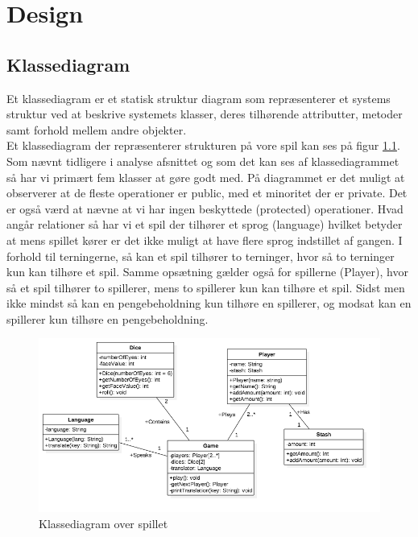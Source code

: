 \chapter{Design}



\section{Klassediagram}

\noindent Et klassediagram er et statisk struktur diagram som repræsenterer et systems struktur ved at beskrive systemets klasser, deres tilhørende attributter, metoder samt forhold mellem andre objekter.\\

\noindent Et klassediagram der repræsenterer strukturen på vore spil kan ses på figur \ref{fig:class_diagram}.
Som nævnt tidligere i analyse afsnittet og som det kan ses af klassediagrammet så har vi primært fem klasser at gøre godt med.
På diagrammet er det muligt at observerer at de fleste operationer er public, med et minoritet der er private.
Det er også værd at nævne at vi har ingen beskyttede (protected) operationer.
Hvad angår relationer så har vi et spil der tilhører et sprog (language) hvilket betyder at mens spillet kører er det ikke muligt at have flere sprog indstillet af gangen.
I forhold til terningerne, så kan et spil tilhører to terninger, hvor så to terninger kun kan tilhøre et spil.
Samme opsætning gælder også for spillerne (Player), hvor så et spil tilhører to spillerer, mens to spillerer kun kan tilhøre et spil.
Sidst men ikke mindst så kan en pengebeholdning kun tilhøre en spillerer, og modsat kan en spillerer kun tilhøre en pengebeholdning.\\

\begin{figure}[H]
    \begin{center}
        \includegraphics[width=15cm]{graphics/Class_Diagram.png}
        \caption{Klassediagram over spillet}
        \label{fig:class_diagram}
    \end{center}
\end{figure}


